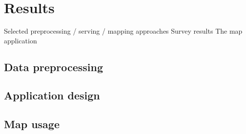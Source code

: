 \section{Results}
Selected preprocessing / serving / mapping approaches
Survey results
The map application

\subsection{Data preprocessing}

\subsection{Application design}

\subsection{Map usage}

